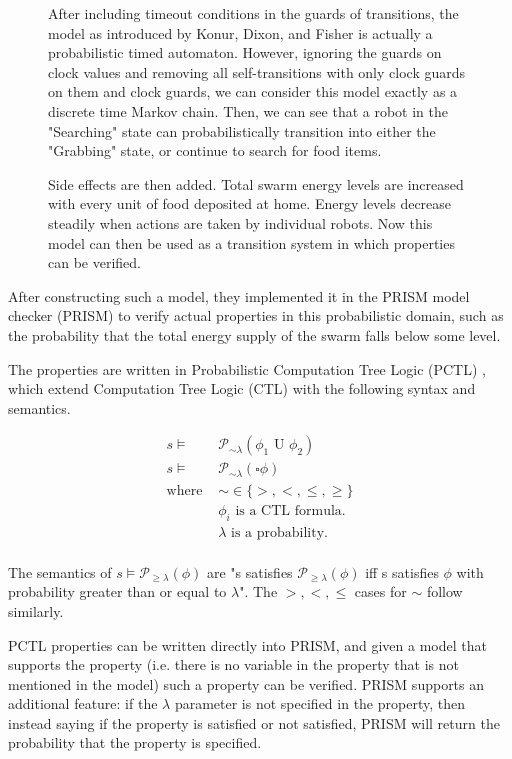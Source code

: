 \documentclass[11pt]{article}
\theoremstyle{definition}
\begin{document}
\begin{figure}
    After including timeout conditions in the guards
    of transitions, the model as introduced by Konur, Dixon, and
    Fisher is actually a probabilistic timed automaton. However,
    ignoring the guards on clock values and removing all self-transitions
    with only clock guards on them and clock guards, we can consider this model
    exactly as a discrete time Markov chain. Then, we can see
    that a robot in the "Searching" state can probabilistically
    transition into either the "Grabbing" state, or continue to
    search for food items.

    Side effects are then added. Total swarm energy levels are increased
    with every unit of food deposited at home. Energy levels decrease
    steadily when actions are taken by individual
    robots. Now this model can then be used as a transition system in
    which properties can be verified.
\end{figure}

After constructing such a model, they implemented it in the PRISM model checker
(PRISM) to verify actual properties in this probabilistic domain, such
as the probability that the total energy supply of the swarm
falls below some level.

The properties are written in Probabilistic Computation Tree
Logic (PCTL) \cite{pctl}, which extend Computation Tree Logic (CTL)
with the following syntax and semantics.

\begin{align*}
    s \vDash & \mathcal{P}_{\sim\lambda}(\phi_1 \text{ U } \phi_2) \\
    s \vDash & \mathcal{P}_{\sim\lambda}(\square \phi) \\
    \text{where } & \sim \in \{ >, <, \leq, \geq \} \\
                  & \phi_i \text{ is a CTL formula.} \\
                  & \lambda \text{ is a probability.} \\
\end{align*}

The semantics of $ s \vDash \mathcal{P}_{\geq\lambda} ( \phi ) $ are
"s satisfies $ \mathcal{P}_{\geq\lambda} ( \phi ) $ iff s
satisfies $ \phi $ with probability greater than or equal
to $ \lambda $".
The $ >, <, \leq $ cases for $ \sim $ follow similarly.

PCTL properties can be written directly into PRISM, and
given a model that supports the property (i.e. there is
no variable in the property that is not mentioned
in the model) such a property can be verified.
PRISM supports an additional feature: if the $ \lambda $
parameter is not specified in the property, then
instead saying if the property is satisfied or not
satisfied, PRISM will return the probability that
the property is specified.
\end{document}
